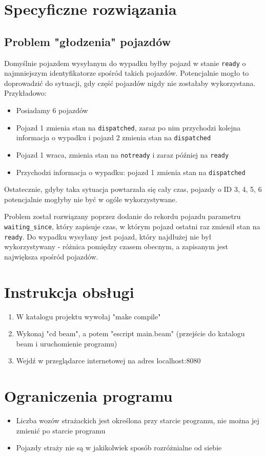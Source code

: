 \documentclass{article}
\begin{document}
\section{Specyficzne rozwiązania}
\subsection{Problem "głodzenia" pojazdów}
Domyślnie pojazdem wysyłanym do wypadku byłby pojazd w stanie \texttt{ready} o najmniejszym identyfikatorze spośród takich pojazdów. Potencjalnie mogło to doprowadzić do sytuacji, gdy część pojazdów nigdy nie zostałaby wykorzystana. Przykładowo:
\begin{itemize}
	\item Posiadamy 6 pojazdów
	\item Pojazd 1 zmienia stan na \texttt{dispatched}, zaraz po nim przychodzi kolejna informacja o wypadku i pojazd 2 zmienia stan na \texttt{dispatched}
	\item Pojazd 1 wraca, zmienia stan na \texttt{notready} i zaraz później na \texttt{ready}
	\item Przychodzi informacja o wypadku: pojazd 1 zmienia stan na \texttt{dispatched}
\end{itemize}
Ostatecznie, gdyby taka sytuacja powtarzała się cały czas, pojazdy o ID 3, 4, 5, 6 potencjalnie mogłyby nie być w ogóle wykorzystywane.

Problem został rozwiązany poprzez dodanie do rekordu pojazdu parametru \texttt{waiting\_since}, który zapisuje czas, w którym pojazd ostatni raz zmienił stan na \texttt{ready}. Do wypadku wysyłany jest pojazd, który najdłużej nie był wykorzystywany - różnica pomiędzy czasem obecnym, a zapisanym jest największa spośród pojazdów.

\section{Instrukcja obsługi}
\begin{enumerate}
	\item W katalogu projektu wywołaj "make compile"
	\item Wykonaj "cd beam", a potem "escript main.beam" (przejście do katalogu beam i uruchomienie programu)
	\item Wejdź w przeglądarce internetowej na adres localhost:8080
\end{enumerate}

\section{Ograniczenia programu}
\begin{itemize}
	\item Liczba wozów strażackich jest określona przy starcie programu, nie można jej zmienić po starcie programu
	\item Pojazdy straży nie są w jakikolwiek sposób rozróżnialne od siebie
\end{itemize}
\end{document}
